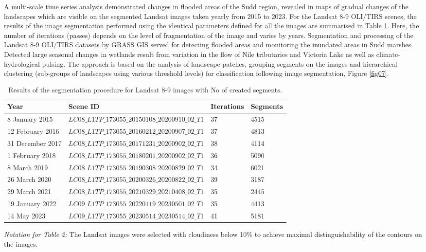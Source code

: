 \documentclass[analytics,article,submit,pdftex,moreauthors]{Definitions/mdpi}
\begin{document}
A multi-scale time series analysis demonstrated changes in flooded areas of the Sudd region, revealed in maps of gradual changes of the landscapes which are visible on the segmented Landsat images taken yearly from 2015 to 2023. For the Landsat 8-9 OLI/TIRS scenes, the results of the image segmentation performed using the identical parameters defined for all the images are summarised in Table \ref{tab03}. Here, the number of iterations (passes) depends on the level of fragmentation of the image and varies by years. Segmentation and processing of the Landsat 8-9 OLI/TIRS datasets by GRASS GIS served for detecting flooded areas and monitoring the inundated areas in Sudd marshes. Detected large seasonal changes in wetlands result from variation in the flow of Nile tributaries and Victoria Lake as well as climate-hydrological pulsing. The approach is based on the analysis of landscape patches, grouping segments on the images and hierarchical clustering (sub-groups of landscapes using various threshold levels) for classification following image segmentation, Figure \ref{fig07}.

\begin{table}[H] 
\begin{threeparttable}
\centering
\caption{Results of the segmentation procedure for Landsat 8-9 images with No of created segments.\label{tab03}}
\begin{tabularx}{\textwidth}{p{2.5cm}p{6.8cm}p{1.7cm}p{2.5cm}}
\toprule
\textbf{Year} & \textbf{Scene ID} & \textbf{Iterations} & \textbf{Segments} \\
\midrule
8 January 2015 & $LC08\_L1TP\_173055\_20150108\_20200910\_02\_T1$ & 37 & 4515  \\
12 February 2016 & $LC08\_L1TP\_173055\_20160212\_20200907\_02\_T1$ & 37 & 4813  \\
31 December 2017 & $LC08\_L1TP\_173055\_20171231\_20200902\_02\_T1$ & 38 & 4114  \\
1 February 2018 & $LC08\_L1TP\_173055\_20180201\_20200902\_02\_T1$ & 36 & 5090  \\
8 March 2019 & $LC08\_L1TP\_173055\_20190308\_20200829\_02\_T1$ & 34 & 6021  \\
26 March 2020 & $LC08\_L1TP\_173055\_20200326\_20200822\_02\_T1$ & 39 & 3187  \\
29 March 2021 & $LC08\_L1TP\_173055\_20210329\_20210408\_02\_T1$ & 35 & 2445  \\
19 January 2022 & $LC09\_L1TP\_173055\_20220119\_20230501\_02\_T1$ & 35 & 4413  \\
14 May 2023 & $LC09\_L1TP\_173055\_20230514\_20230514\_02\_T1$ & 41 & 5181  \\
\bottomrule
\end{tabularx}
\begin{tablenotes}
      \small
      	\item \emph{Notation for Table 2:} The Landsat images were selected with cloudiness below 10\% to achieve maximal distinguishability of the contours on the images.
    \end{tablenotes}
  \end{threeparttable}
\end{table}
\end{document}
